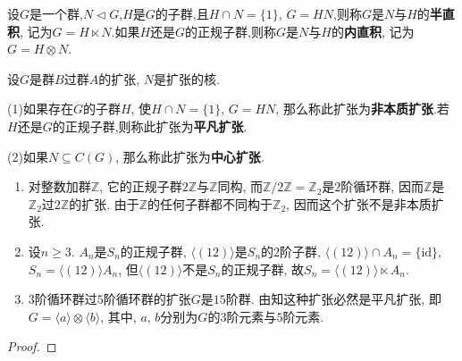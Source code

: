 \documentclass[../../main.tex]{subfiles}%
\begin{document}
\begin{definition}
设$G$是一个群,$N\lhd G$,$H$是$G$的子群,且$H\cap N = \{1\}$, $G = HN$,则称$G$是$N$与$H$的\textbf{半直积}, 记为$G = H\ltimes N$.如果$H$还是$G$的正规子群,则称$G$是$N$与$H$的\textbf{内直积}, 记为$G = H\otimes N$.
\end{definition}

\begin{definition}\label{definition:内直积和中心扩张定义}
设$G$是群$B$过群$A$的扩张, $N$是扩张的核. 

(1)如果存在$G$的子群$H$, 使$H\cap N = \{1\}$, $G = HN$, 那么称此扩张为\textbf{非本质扩张}.若$H$还是$G$的正规子群,则称此扩张为\textbf{平凡扩张}.

(2)如果$N\subseteq C(G)$, 那么称此扩张为\textbf{中心扩张}.
\end{definition}

\begin{example}
\begin{enumerate}
\item 对整数加群$\mathbb{Z}$, 它的正规子群$2\mathbb{Z}$与$\mathbb{Z}$同构, 而$\mathbb{Z}/2\mathbb{Z} = \mathbb{Z}_2$是$2$阶循环群, 因而$\mathbb{Z}$是$\mathbb{Z}_2$过$2\mathbb{Z}$的扩张. 由于$\mathbb{Z}$的任何子群都不同构于$\mathbb{Z}_2$, 因而这个扩张不是非本质扩张.
\item 设$n\geqslant 3$. $A_n$是$S_n$的正规子群, $\langle(12)\rangle$是$S_n$的$2$阶子群, $\langle(12)\rangle\cap A_n = \{\text{id}\}$, $S_n = \langle(12)\rangle A_n$, 但$\langle(12)\rangle$不是$S_n$的正规子群, 故$S_n = \langle(12)\rangle\ltimes A_n$.
\item $3$阶循环群过$5$阶循环群的扩张$G$是$15$阶群. 由知这种扩张必然是平凡扩张, 即$G = \langle a\rangle\otimes\langle b\rangle$, 其中, $a$, $b$分别为$G$的$3$阶元素与$5$阶元素.
\end{enumerate}
\end{example}
\begin{proof}



\end{proof}
\end{document}
